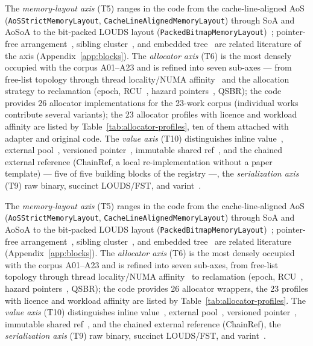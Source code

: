 \begin{nurlang}
The \emph{memory-layout axis} (T5) ranges in the code from the cache-line-aligned AoS
(\texttt{AoS\allowbreak{}Strict\allowbreak{}Memory\allowbreak{}Layout},
\texttt{Cache\allowbreak{}Line\allowbreak{}Aligned\allowbreak{}Memory\allowbreak{}Layout}) through SoA and AoSoA to the
bit-packed LOUDS layout
(\texttt{Packed\allowbreak{}Bitmap\allowbreak{}Memory\allowbreak{}Layout})~\cite{jacobson1989louds}; pointer-free
arrangement~\cite{rao1999css}, sibling cluster~\cite{rao2000csb}, and embedded
tree~\cite{schmeisser2022b2tree} are related literature of the axis (Appendix~\ref{app:blocks}). The
\emph{allocator axis} (T6) is the most densely occupied with the corpus A01--A23 and is refined into seven
sub-axes --- from free-list topology through thread locality/NUMA affinity~\cite{ungethuem2017survey}
and the allocation strategy to reclamation (epoch, RCU~\cite{mckenney2001rcu},
hazard pointers~\cite{michael2004hazard}, QSBR); the code provides 26 allocator implementations for the
23-work corpus (individual works contribute several variants); the 23 allocator profiles with licence
and workload affinity are listed by Table~\ref{tab:allocator-profiles}, ten of them attached with
adapter and original code. The \emph{value axis} (T10) distinguishes inline value~\cite{leis2013art}, external
pool~\cite{wu2019wormhole}, versioned pointer~\cite{mao2012masstree}, immutable
shared ref~\cite{mckenney2001rcu}, and the chained external reference (ChainRef, a local re-implementation
without a paper template) --- five of five building blocks of the registry ---, the \emph{serialization axis} (T9)
raw binary, succinct LOUDS/FST, and
varint~\cite{leis2013art}.
\end{nurlang}
\begin{nurkurz}
The \emph{memory-layout axis} (T5) ranges in the code from the cache-line-aligned AoS
(\texttt{AoS\allowbreak{}Strict\allowbreak{}Memory\allowbreak{}Layout},
\texttt{Cache\allowbreak{}Line\allowbreak{}Aligned\allowbreak{}Memory\allowbreak{}Layout}) through SoA and AoSoA
to the bit-packed LOUDS layout
(\texttt{Packed\allowbreak{}Bitmap\allowbreak{}Memory\allowbreak{}Layout})~\cite{jacobson1989louds}; pointer-free
arrangement~\cite{rao1999css}, sibling cluster~\cite{rao2000csb}, and embedded
tree~\cite{schmeisser2022b2tree} are related literature (Appendix~\ref{app:blocks}). The \emph{allocator
axis} (T6) is the most densely occupied with the corpus A01--A23 and is refined into seven sub-axes, from
free-list topology through thread locality/NUMA affinity~\cite{ungethuem2017survey} to reclamation (epoch,
RCU~\cite{mckenney2001rcu}, hazard pointers~\cite{michael2004hazard}, QSBR); the code provides 26 allocator
wrappers, the 23 profiles with licence and workload affinity are listed by
Table~\ref{tab:allocator-profiles}. The \emph{value axis} (T10) distinguishes inline
value~\cite{leis2013art}, external pool~\cite{wu2019wormhole}, versioned pointer~\cite{mao2012masstree},
immutable shared ref~\cite{mckenney2001rcu}, and the chained external reference (ChainRef), the
\emph{serialization axis} (T9) raw binary, succinct LOUDS/FST, and varint~\cite{leis2013art}.
\end{nurkurz}

